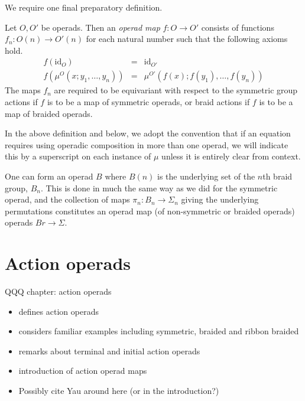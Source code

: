 \documentclass{amsbook} %
\numberwithin{section}{chapter}
\begin{document}
We require one final preparatory definition.

\begin{Defi}
Let $O,O'$ be operads.  Then an \textit{operad map} $f \colon O \rightarrow O'$ consists of functions $f_{n} \colon O(n) \rightarrow O'(n)$ for each natural number such that the following axioms hold.
\[
\begin{array}{rcl}
f(\textrm{id}_{O}) & = & \textrm{id}_{O'} \\
f(\mu^{O}(x; y_{1}, \ldots, y_{n})) & = & \mu^{O'}(f(x); f(y_{1}), \ldots, f(y_{n}))
\end{array}
\]
The maps $f_{n}$ are required to be equivariant with respect to the symmetric group actions if $f$ is to be a map of symmetric operads, or braid actions if $f$ is to be a map of braided operads.
\end{Defi}

\begin{conv}
In the above definition and below, we adopt the convention that if an equation requires using operadic composition in more than one operad, we will indicate this by a superscript on each instance of $\mu$ unless it is entirely clear from context.
\end{conv}

\begin{example}
One can form an operad $B$ where $B(n)$ is the underlying set of the $n$th braid group, $B_{n}$.  This is done in much the same way as we did for the symmetric operad, and the collection of maps $\pi_{n} \colon B_{n} \rightarrow \Sigma_{n}$ giving the underlying permutations constitutes an operad map (of non-symmetric or braided operads) operads $Br \rightarrow \Sigma$.
\end{example}

\section{Action operads}

 	QQQ chapter: action operads
 	\begin{itemize}
 		\item defines action operads 
 		\item considers familiar examples including symmetric, braided and ribbon braided
 		\item remarks about terminal and initial action operads
 		\item introduction of action operad maps
    \item Possibly cite Yau around here (or in the introduction?)
 	\end{itemize}
\end{document}
